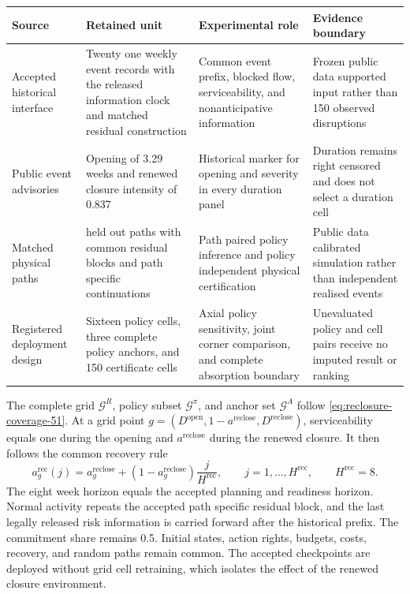 \documentclass[a4paper,fleqn]{cas-sc}
\begin{document}
\begingroup
\setlength{\tabcolsep}{4pt}
\begin{center}
\centering
{}
\label{tab:532-reclosure-inputs}
\begin{tabular}{>{\RaggedRight\arraybackslash}p{}
                >{\RaggedRight\arraybackslash}p{}
                >{\RaggedRight\arraybackslash}p{}
                >{\RaggedRight\arraybackslash}p{}}
\toprule
Source & Retained unit & Experimental role & Evidence boundary \\
\midrule
Accepted historical interface
& Twenty one weekly event records with the released information clock and matched residual construction
& Common event prefix, blocked flow, serviceability, and nonanticipative information
& Frozen public data supported input rather than 150 observed disruptions \\
Public event advisories
& Opening of 3.29 weeks and renewed closure intensity of 0.837
& Historical marker for opening and severity in every duration panel
& Duration remains right censored and does not select a duration cell \\
Matched physical paths
& 196 held out paths with common residual blocks and path specific continuations
& Path paired policy inference and policy independent physical certification
& Public data calibrated simulation rather than independent realised events \\
Registered deployment design
& Sixteen policy cells, three complete policy anchors, and 150 certificate cells
& Axial policy sensitivity, joint corner comparison, and complete absorption boundary
& Unevaluated policy and cell pairs receive no imputed result or ranking \\
\bottomrule
\end{tabular}
\end{center}
\endgroup

The complete grid $\mathcal G^R$, policy subset $\mathcal G^\pi$, and anchor
set $\mathcal G^A$ follow \cref{eq:reclosure-coverage-51}. At a grid point
$g=(D^{\mathrm{open}},1-a^{\mathrm{reclose}},D^{\mathrm{reclose}})$,
serviceability equals one during the opening and
$a^{\mathrm{reclose}}$ during the renewed closure. It then follows the common
recovery rule
\begin{equation}
 a^{\mathrm{rec}}_g(j)=a^{\mathrm{reclose}}_g+
 \left(1-a^{\mathrm{reclose}}_g\right)
 \frac{j}{H^{\mathrm{rec}}},
 \qquad j=1,\ldots,H^{\mathrm{rec}},
 \qquad H^{\mathrm{rec}}=8.
 \label{eq:reclosure-recovery-532}
\end{equation}
The eight week horizon equals the accepted planning and readiness horizon.
Normal activity repeats the accepted path specific residual block, and the
last legally released risk information is carried forward after the historical
prefix. The commitment share remains 0.5. Initial states, action rights,
budgets, costs, recovery, and random paths remain common. The accepted
checkpoints are deployed without grid cell retraining, which isolates the
effect of the renewed closure environment.
\end{document}
